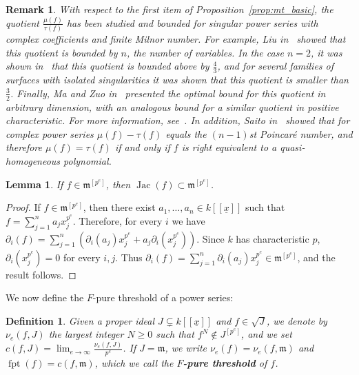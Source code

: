 \documentclass{article}
\newtheorem{definition}[theorem]{Definition}
\newtheorem{lemma}[theorem]{Lemma}
\newtheorem{remark}[theorem]{Remark}
\DeclareMathOperator{\Jac}{Jac}
\DeclareMathOperator{\fpt}{fpt}
\newcommand{\kx}{k[[\underline{x}]]}
\numberwithin{theorem}{section}
\begin{document}
\begin{remark}
\textup{With respect to the first item of Proposition~\ref{prop:mt_basic}, the quotient $\frac{\mu(f)}{\tau(f)}$ has been studied and bounded for singular power series with complex coefficients and finite Milnor number. For example, Liu in~\cite{liu2018milnor} showed that this quotient is bounded by $n$, the number of variables. In the case $n=2$, it was shown in~\cite{almiron2019note} that this quotient is bounded above by $\frac{4}{3}$, and for several families of surfaces with isolated singularities it was shown that this quotient is smaller than $\frac{3}{2}$. Finally, Ma and Zuo in~\cite{ma2026quotient} presented the optimal bound for this quotient in arbitrary dimension, with an analogous bound for a similar quotient in positive characteristic. For more information, see~\cite{almiron2022quotient,almiron20214,alberich2021minimal}. In addition, Saito in~\cite{saito1971quasihomogene} showed that for complex power series $\mu(f)-\tau(f)$ equals the $(n-1)$st Poincar\'e number, and therefore $\mu(f)=\tau(f)$ if and only if $f$ is right equivalent to a quasi-homogeneous polynomial.}
\end{remark}

\begin{lemma}\label{lem:jac_frob}
If $f\in\mathfrak{m}^{[p^e]}$, then $\Jac(f)\subset\mathfrak{m}^{[p^e]}$.
\end{lemma}

\begin{proof}
If $f\in\mathfrak{m}^{[p^e]}$, then there exist $a_1,\dots,a_n\in\kx$ such that $f=\sum_{j=1}^n a_jx_j^{p^e}$. Therefore, for every $i$ we have $\partial_i(f)=\sum_{j=1}^n(\partial_i(a_j)x_j^{p^e}+a_j\partial_i(x_j^{p^e}))$. Since $k$ has characteristic $p$, $\partial_i(x_j^{p^e})=0$ for every $i,j$. Thus $\partial_i(f)=\sum_{j=1}^n\partial_i(a_j)x_j^{p^e}\in\mathfrak{m}^{[p^e]}$, and the result follows.
\end{proof}

We now define the $F$-pure threshold of a power series:

\begin{definition}\label{def:Fpt}
Given a proper ideal $J\subsetneq\kx$ and $f\in\sqrt J$, we denote by $\nu_e(f,J)$ the largest integer $N\geq0$ such that $f^N\notin J^{[p^e]}$, and we set $c(f,J)=\lim_{e\to\infty}\frac{\nu_e(f,J)}{p^e}$. If $J=\mathfrak{m}$, we write $\nu_e(f)=\nu_e(f,\mathfrak{m})$ and $\fpt(f)=c(f,\mathfrak{m})$, which we call the \textbf{$F$-pure threshold} of $f$.
\end{definition}
\end{document}
